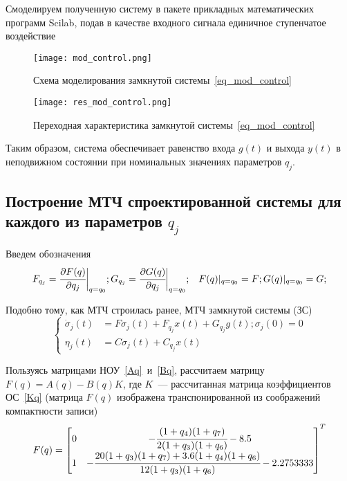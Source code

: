 Смоделируем полученную систему в пакете прикладных математических программ Scilab, подав в качестве входного сигнала единичное ступенчатое воздействие
\begin{figure}[h!]
	\centering
	\texttt{[image: mod\_control.png]}
	\caption{Схема моделирования замкнутой системы~\ref{eq_mod_control}}
	\label{fig:mod_control}
\end{figure}
\newpage


\begin{figure}[h]
	\centering
	\texttt{[image: res\_mod\_control.png]}
	\caption{Переходная характеристика замкнутой системы~\ref{eq_mod_control}}
	\label{fig:mod_control}
\end{figure}

Таким образом, система обеспечивает равенство входа $g(t)$ и выхода $y(t)$ в неподвижном состоянии при номинальных значениях параметров $q_j$.

\subsection{Построение МТЧ спроектированной системы для каждого из параметров $q_j$}

Введем обозначения
\begin{align*}
&F_{q_j} = \cfrac{\partial{F(q)}}{\partial{q_j}} \bigg|_{q=q_0};
G_{q_j} = \cfrac{\partial{G(q)}}{\partial{q_j}} \bigg|_{q=q_0};
&F(q)|_{q=q_0} = F;
G(q)|_{q=q_0} = G;
\end{align*}

Подобно тому, как МТЧ строилась ранее, МТЧ замкнутой системы (ЗС)
\begin{equation}\label{eq_mts_ls_3}
	\begin{cases}
		\dot \sigma_j(t) &= F \sigma_j(t) + F_{q_j} x(t) + G_{q_j} g(t); 
		\sigma_j (0) = 0\\
		\eta_j (t) &= C \sigma_j (t) + C_{q_j} x(t)
	\end{cases}
\end{equation}

Пользуясь матрицами НОУ~\ref{Aq}~и~\ref{Bq}, рассчитаем матрицу $F(q) = A(q) - B(q) K$, где $K$~--- рассчитанная матрица коэффициентов ОС~\ref{Kq} (матрица $F(q)$ изображена транспонированной из соображений компактности записи)
\begin{equation}
	F(q) =
	\begin{bmatrix}
		0 & - \cfrac{(1+q_4)(1+q_7)}{2(1+q_3)(1+q_6)} - 8.5 \\
		1 & - \cfrac{20(1+q_3)(1+q_7)+3.6(1+q_4)(1+q_6)}{12(1+q_3)(1+q_6)} - 2.2753333
	\end{bmatrix}^T
\end{equation}

